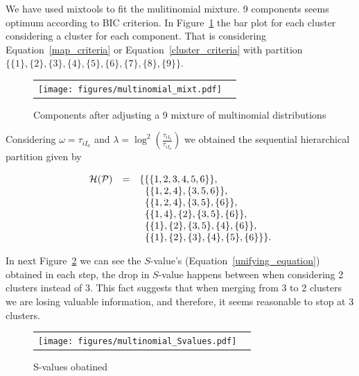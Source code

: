 \documentclass[10pt, a4paper]{article}
\newcommand{\pkg}[1]{{\fontseries{b}\selectfont #1}}
\begin{document}
\begin{spacing}{1.9}
We have used \pkg{mixtools} to fit the mulitinomial mixture. 9 components seems optimum according to BIC criterion. In Figure~\ref{multinomial_mixture} the bar plot for each cluster considering a cluster for each component. That is considering Equation~\ref{map_criteria} or Equation~\ref{cluster_criteria} with partition $\{\{1\}, \{2\}, \{3\}, \{4\}, \{5\}, \{6\}, \{7\}, \{8\}, \{9\} \}$.

\begin{figure}[t]
\begin{center}
\begin{tabular}{cc}
  \texttt{[image: figures/multinomial\_mixt.pdf]} \\
 \end{tabular}
 \caption{Components after adjusting a 9 mixture of multinomial distributions}\label{multinomial_mixture}
\end{center}
\end{figure}

Considering $\omega = \tau_{i I_a}$ and $\lambda = \log^2 \left(\frac{ \tau_{iI_b} }{ \tau_{iI_a} }\right)$ we obtained the sequential hierarchical partition given by


\begin{equation}
\begin{array}{r c l}
\mathcal{H}(\mathcal{P}) &=& \{ \{ \{1,2,3,4,5,6\}\}, \\ 
 & & \;\; \{\{1,2,4\},\{3,5,6\}\}, \\ 
 & & \;\; \{\{1,2,4\},\{3,5\},\{6\}\}, \\ 
 & & \;\; \{\{1,4\},\{2\},\{3,5\},\{6\}\}, \\ 
 & & \;\; \{\{1\},\{2\},\{3,5\},\{4\},\{6\}\}, \\ 
 & & \;\; \{\{1\},\{2\},\{3\},\{4\},\{5\},\{6\} \} \}.
\end{array}
\label{hier_ex_multinomial}
\end{equation}

In next Figure~\ref{multinomial_Svalues} we can see the $S$-value's (Equation~\ref{unifying_equation}) obtained in each step, the drop in $S$-value happens between when considering 2 clusters instead of 3. This fact suggests that when merging from 3 to 2 clusters we are losing valuable information, and therefore, it seems reasonable to stop at 3 clusters.

\begin{figure}[t]
\begin{center}
\begin{tabular}{cc}
  \texttt{[image: figures/multinomial\_Svalues.pdf]} \\
 \end{tabular}
 \caption{S-values obatined}\label{multinomial_Svalues}
\end{center}
\end{figure}


\end{spacing}
\end{document}
